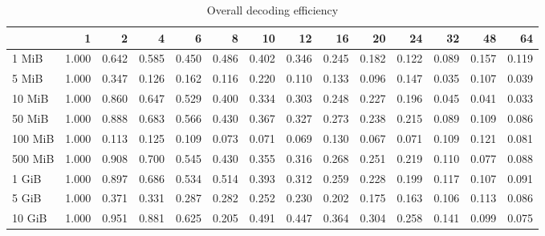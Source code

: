 \begin{centering}
\begin{table}[!h]
	\caption{Overall decoding efficiency}
	\begin{tabular}{lrrrrrrrrrrrrr}
		\toprule
		\diagbox[width=7em]{Sizes}{Threads} & 1  &    2  &    4  &    6  &    8  &    10 &    12 &    16 &    20 &    24 &    32 &    48 &    64 \\
		\midrule
		1 MiB   & 1.000 & 0.642 & 0.585 & 0.450 & 0.486 & 0.402 & 0.346 & 0.245 & 0.182 & 0.122 & 0.089 & 0.157 & 0.119 \\
		5 MiB   & 1.000 & 0.347 & 0.126 & 0.162 & 0.116 & 0.220 & 0.110 & 0.133 & 0.096 & 0.147 & 0.035 & 0.107 & 0.039 \\
		10 MiB  & 1.000 & 0.860 & 0.647 & 0.529 & 0.400 & 0.334 & 0.303 & 0.248 & 0.227 & 0.196 & 0.045 & 0.041 & 0.033 \\
		50 MiB  & 1.000 & 0.888 & 0.683 & 0.566 & 0.430 & 0.367 & 0.327 & 0.273 & 0.238 & 0.215 & 0.089 & 0.109 & 0.086 \\
		100 MiB & 1.000 & 0.113 & 0.125 & 0.109 & 0.073 & 0.071 & 0.069 & 0.130 & 0.067 & 0.071 & 0.109 & 0.121 & 0.081 \\
		500 MiB & 1.000 & 0.908 & 0.700 & 0.545 & 0.430 & 0.355 & 0.316 & 0.268 & 0.251 & 0.219 & 0.110 & 0.077 & 0.088 \\
		1 GiB   & 1.000 & 0.897 & 0.686 & 0.534 & 0.514 & 0.393 & 0.312 & 0.259 & 0.228 & 0.199 & 0.117 & 0.107 & 0.091 \\
		5 GiB   & 1.000 & 0.371 & 0.331 & 0.287 & 0.282 & 0.252 & 0.230 & 0.202 & 0.175 & 0.163 & 0.106 & 0.113 & 0.086 \\
		10 GiB  & 1.000 & 0.951 & 0.881 & 0.625 & 0.205 & 0.491 & 0.447 & 0.364 & 0.304 & 0.258 & 0.141 & 0.099 & 0.075 \\
		\bottomrule
	\end{tabular}
\end{table}


\end{centering}
